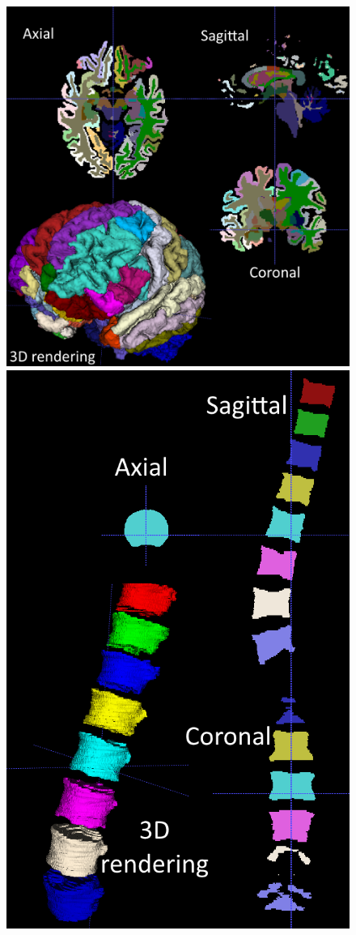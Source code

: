 \documentclass{InsightArticle}
\begin{document}
\begin{figure}
\center
\includegraphics[scale=0.3]{brainParc.png}
\includegraphics[scale=0.3]{vb-seg.png}

\end{figure}
\end{document}
